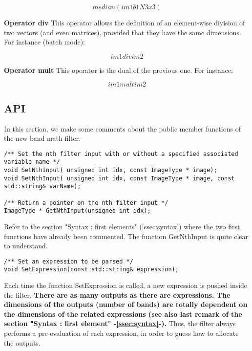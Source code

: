 \begin{equation}
	median(im1b1N3x3)
\end{equation}


\textbf{Operator div} \newline
This operator allows the definition of an element-wise division of two vectors (and even matrices), provided that they have the same dimensions. For instance (batch mode): 

\begin{equation}
	im1  div  im2
\end{equation}

\textbf{Operator mult} \newline
This operator is the dual of the previous one. For instance:

\begin{equation}
	im1  mult  im2
\end{equation}



\subsection{API}\label{ssec:API}

In this section, we make some comments about the public member functions of the new band math filter.

\begin{verbatim}
/** Set the nth filter input with or without a specified associated variable name */
void SetNthInput( unsigned int idx, const ImageType * image);
void SetNthInput( unsigned int idx, const ImageType * image, const std::string& varName);

/** Return a pointer on the nth filter input */
ImageType * GetNthInput(unsigned int idx);
\end{verbatim}

Refer to the section "Syntax : first elements" (\ref{ssec:syntax}) where the two first functions have already been commented. The function GetNthInput is quite clear to understand.

\begin{verbatim}
/** Set an expression to be parsed */
void SetExpression(const std::string& expression);
\end{verbatim}

Each time the function  SetExpression is called, a new expression is pushed inside the filter. \textbf{There are as many outputs as there are expressions. The dimensions of the outputs (number of bands) are totally dependent on the dimensions of the related expressions (see also last remark of the section "Syntax : first element" -\ref{ssec:syntax}-).} Thus, the filter always performs a pre-evaluation of each expression, in order to guess how to allocate the outputs.


